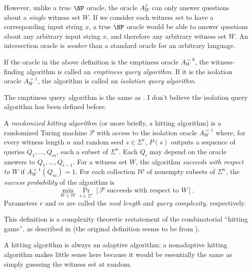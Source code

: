 \documentclass{article}
\newcommand{\mc}{\mathcal}
\begin{document}
However, unlike a true $\NP$ oracle, the oracle $A^f_W$ can only answer questions about a \emph{single} witness set $W$.
If we consider each witness set to have a corresponding input string $x$, a true $\NP$ oracle would be able to answer questions about any arbitrary input string $x$, and therefore any arbitrary witness set $W$.
An intersection oracle is \emph{weaker} than a standard oracle for an arbitrary language.

\begin{definition}
  If the oracle in the above definition is the emptiness oracle $A^{=0}_W$, the witness-finding algorithm is called an \emph{emptiness query algorithm}.
  If it is the isolation oracle $A^{=1}_W$, the algorithm is called an \emph{isolation query algorithm}.
\end{definition}

The emptiness query algorithm is the same as \autocite[Definition~2]{krw12}.
I don't believe the isolation query algorithm has been defined before.

\begin{definition}
  A \emph{randomized hitting algorithm} (or more briefly, a hitting algorithm) is a randomized Turing machine $\mc{P}$ with access to the isolation oracle $A^{=1}_W$ where, for every witness length $n$ and random seed $s \in \Sigma^r$, $P(s)$ outputs a sequence of queries $Q_1, \dotsc, Q_m$, each a subset of $\Sigma^n$.
  Each $Q_i$ may depend on the oracle answers to $Q_1, \dotsc, Q_{i - 1}$.
  For a witness set $W$, the algorithm \emph{succeeds with respect to $W$} if $A^{=1}_W(Q_m) = 1$.
  For each collection $\mc{W}$ of nonempty subsets of $\Sigma^n$, the \emph{success probability} of the algorithm is
  \begin{equation*}
    \min_{W \in \mc{W}} \Pr_{s \in \Sigma^r} [\mc{P} \text{ succeeds with respect to } W].
  \end{equation*}
  Parameters $r$ and $m$ are called the \emph{seed length} and \emph{query complexity}, respectively.
\end{definition}

This definition is a complexity theoretic restatement of the combinatorial ``hitting game'', as described in \autocite[Section~3]{newport14} (the original definition seems to be from \autocite[Definition~5]{bgi92}).

A hitting algorithm is always an adaptive algorithm; a nonadaptive hitting algorithm makes little sense here because it would be essentially the same as simply guessing the witness set at random.
\end{document}
